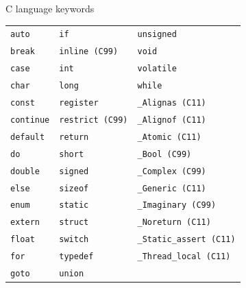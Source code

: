 \begin{frame}{C language keywords}
    \begin{center}
        \begin{tabular}{l|l|l}
            \texttt{auto}        &     \texttt{if}                &     \texttt{unsigned}                \\
            \texttt{break}       &     \texttt{inline (C99)}      &     \texttt{void}                    \\
            \texttt{case}        &     \texttt{int}               &     \texttt{volatile}                \\
            \texttt{char}        &     \texttt{long}              &     \texttt{while}                   \\
            \texttt{const}       &     \texttt{register}          &     \texttt{\_Alignas (C11)}         \\
            \texttt{continue}    &     \texttt{restrict (C99)}    &     \texttt{\_Alignof (C11)}         \\
            \texttt{default}     &     \texttt{return}            &     \texttt{\_Atomic (C11)}          \\
            \texttt{do}          &     \texttt{short}             &     \texttt{\_Bool (C99)}            \\
            \texttt{double}      &     \texttt{signed}            &     \texttt{\_Complex (C99)}         \\
            \texttt{else}        &     \texttt{sizeof}            &     \texttt{\_Generic (C11)}         \\
            \texttt{enum}        &     \texttt{static}            &     \texttt{\_Imaginary (C99)}       \\
            \texttt{extern}      &     \texttt{struct}            &     \texttt{\_Noreturn (C11)}        \\
            \texttt{float}       &     \texttt{switch}            &     \texttt{\_Static\_assert (C11)}  \\
            \texttt{for}         &     \texttt{typedef}           &     \texttt{\_Thread\_local (C11)}   \\
            \texttt{goto}        &     \texttt{union}             &
        \end{tabular}
    \end{center}
\end{frame}
